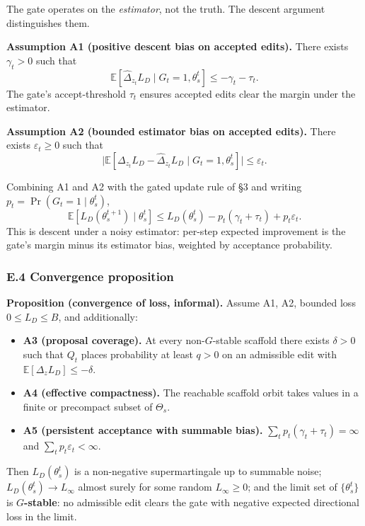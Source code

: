 The gate operates on the \emph{estimator}, not the truth. The descent
argument distinguishes them.

\textbf{Assumption A1 (positive descent bias on accepted edits).} There
exists \(\gamma_t > 0\) such that
\[\mathbb{E}\!\left[\widehat{\Delta}_{z_t} L_D \mid G_t = 1, \theta_s^t\right] \leq -\gamma_t - \tau_t.\]
The gate's accept-threshold \(\tau_t\) ensures accepted edits clear the
margin under the estimator.

\textbf{Assumption A2 (bounded estimator bias on accepted edits).} There
exists \(\varepsilon_t \geq 0\) such that
\[\big|\mathbb{E}\!\left[\Delta_{z_t} L_D - \widehat{\Delta}_{z_t} L_D \mid G_t = 1, \theta_s^t\right]\big| \leq \varepsilon_t.\]

Combining A1 and A2 with the gated update rule of §3 and writing
\(p_t = \Pr(G_t = 1 \mid \theta_s^t)\),
\[\mathbb{E}\!\left[L_D(\theta_s^{t+1}) \mid \theta_s^t\right] \leq L_D(\theta_s^t) - p_t(\gamma_t + \tau_t) + p_t \varepsilon_t.\]
This is descent under a noisy estimator: per-step expected improvement
is the gate's margin minus its estimator bias, weighted by acceptance
probability.

\subsubsection{E.4 Convergence
proposition}\label{e.4-convergence-proposition}

\textbf{Proposition (convergence of loss, informal).} Assume A1, A2,
bounded loss \(0 \leq L_D \leq B\), and additionally:

\begin{itemize}
\tightlist
\item
  \textbf{A3 (proposal coverage).} At every non-\(G\)-stable scaffold
  there exists \(\delta > 0\) such that \(Q_t\) places probability at
  least \(q > 0\) on an admissible edit with
  \(\mathbb{E}[\Delta_z L_D] \leq -\delta\).
\item
  \textbf{A4 (effective compactness).} The reachable scaffold orbit
  takes values in a finite or precompact subset of \(\Theta_s\).
\item
  \textbf{A5 (persistent acceptance with summable bias).}
  \(\sum_t p_t (\gamma_t + \tau_t) = \infty\) and
  \(\sum_t p_t \varepsilon_t < \infty\).
\end{itemize}

Then \(L_D(\theta_s^t)\) is a non-negative supermartingale up to
summable noise; \(L_D(\theta_s^t) \to L_\infty\) almost surely for some
random \(L_\infty \geq 0\); and the limit set of \(\{\theta_s^t\}\) is
\textbf{\(G\)-stable}: no admissible edit clears the gate with negative
expected directional loss in the limit.

